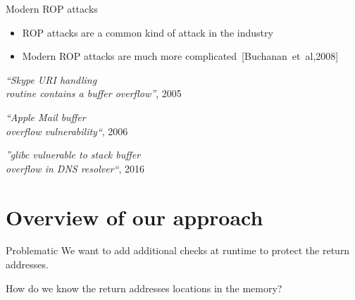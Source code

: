 \documentclass{beamer}
\begin{document}
\begin{frame}[c]{Modern ROP attacks}
	\begin{itemize}
		\item ROP attacks are a common kind of attack in the industry
		\item Modern ROP attacks are much more complicated~[Buchanan~et~al,2008]
	\end{itemize}
	\begin{center}
		\textit{``Skype URI handling\\ routine contains a buffer overflow''}, 2005\footnotemark \\
	\end{center}
	\vspace{4mm}
	\textit{``Apple Mail buffer \\overflow vulnerability``}, 2006\\
	\begin{flushright}
		\textit{''glibc vulnerable to stack buffer \\overflow in DNS resolver``}, 2016
	\end{flushright}

\end{frame}




\section{Overview of our approach}
\label{sec:Overview of our approach}




\begin{frame}[c]{Problematic}
	We want to add additional checks at runtime to protect the return addresses. \\
	\begin{center}
		{\Large How do we know the return addresses locations in the memory?}	
		\break
		\break
		\visible<2>{\textcolor{red}{$\Rightarrow$~Modify the memory structure to have an easy way to distinguish return addresses locations}}
	\end{center}
\end{frame}
\end{document}
